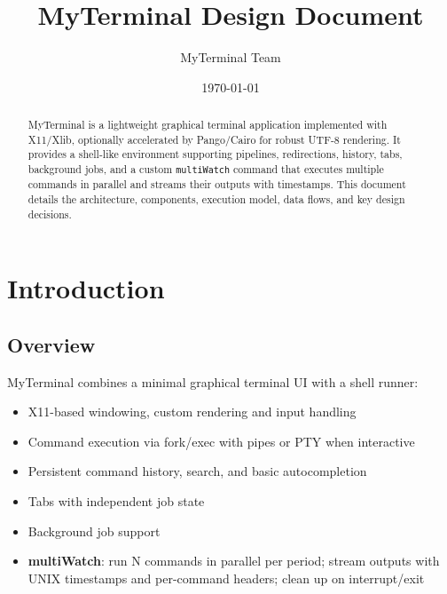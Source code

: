 \documentclass[11pt,a4paper]{article}
\title{MyTerminal Design Document}
\author{MyTerminal Team}
\date{\today}
\begin{document}
\maketitle

\begin{abstract}
MyTerminal is a lightweight graphical terminal application implemented with X11/Xlib, optionally accelerated by Pango/Cairo for robust UTF-8 rendering. It provides a shell-like environment supporting pipelines, redirections, history, tabs, background jobs, and a custom \texttt{multiWatch} command that executes multiple commands in parallel and streams their outputs with timestamps. This document details the architecture, components, execution model, data flows, and key design decisions.
\end{abstract}

\tableofcontents

\section{Introduction}

\subsection{Overview}
MyTerminal combines a minimal graphical terminal UI with a shell runner:
\begin{itemize}[leftmargin=*]
  \item X11-based windowing, custom rendering and input handling
  \item Command execution via fork/exec with pipes or PTY when interactive
  \item Persistent command history, search, and basic autocompletion
  \item Tabs with independent job state
  \item Background job support
  \item \textbf{multiWatch}: run N commands in parallel per period; stream outputs with UNIX timestamps and per-command headers; clean up on interrupt/exit
\end{itemize}
\end{document}
